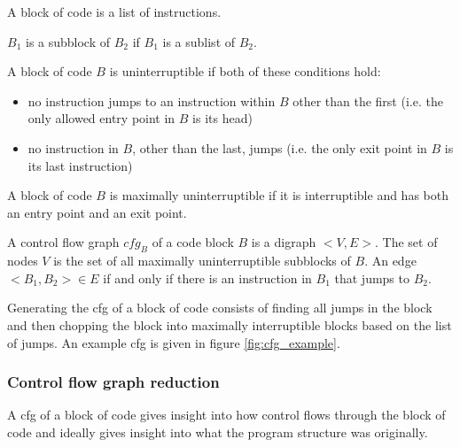 \documentclass[leqno,11pt]{article}
\begin{document}
\begin{definition}
A block of code is a list of instructions.
\end{definition}
\begin{definition}
$B_1$ is a subblock of $B_2$ if $B_1$ is a sublist of $B_2$.
\end{definition}
\begin{definition}
A block of code $B$ is uninterruptible if both of these conditions hold:
\begin{itemize}
 \item no instruction jumps to an instruction within $B$ other than the first (i.e. the only allowed entry point in $B$ is its head)
 \item no instruction in $B$, other than the last, jumps (i.e. the only exit point in $B$ is its last instruction)
\end{itemize}
\end{definition}
\begin{definition}
A block of code $B$ is maximally uninterruptible if it is interruptible and has both an entry point and an exit point.
\end{definition}
\begin{definition}
A control flow graph $cfg_B$ of a code block $B$ is a digraph $<V,E>$. The set of nodes $V$ is the set of all maximally uninterruptible subblocks of $B$. An edge $<B_1, B_2> \in E$ if and only if there is an instruction in $B_1$ that jumps to $B_2$.
\end{definition}

Generating the cfg of a block of code consists of finding all jumps in the block and then chopping the block into maximally interruptible blocks based on the list of jumps. An example cfg is given in figure \ref{fig:cfg_example}.

\subsubsection{Control flow graph reduction}

A cfg of a block of code gives insight into how control flows through the block of code and ideally gives insight into what the program structure was originally. 
\end{document}
